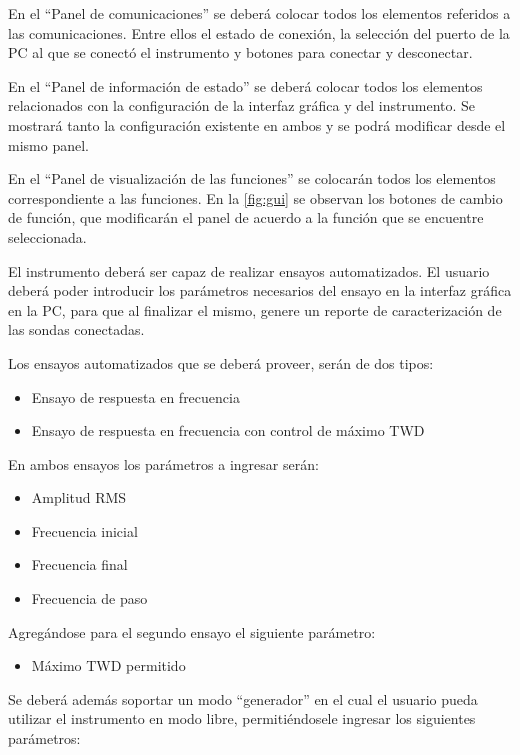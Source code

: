\documentclass[titlepage, 12pt]{article}
\begin{document}
  En el ``Panel de comunicaciones'' se deberá colocar todos los elementos referidos a las comunicaciones. Entre ellos el estado de conexión, la selección del puerto de la PC al que se conectó el instrumento y botones para conectar y desconectar.

  En el ``Panel de información de estado'' se deberá colocar todos los elementos relacionados con la configuración de la interfaz gráfica y del instrumento. Se mostrará tanto la configuración existente en ambos y se podrá modificar desde el mismo panel.

  En el ``Panel de visualización de las funciones'' se colocarán todos los elementos correspondiente a las funciones. En la \autoref{fig:gui} se observan los botones de cambio de función, que modificarán el panel de acuerdo a la función que se encuentre seleccionada.

  El instrumento deberá ser capaz de realizar ensayos automatizados. El usuario deberá poder introducir los parámetros necesarios del ensayo en la interfaz gráfica en la PC, para que al finalizar el mismo, genere un reporte de caracterización de las sondas conectadas.

  Los ensayos automatizados que se deberá proveer, serán de dos tipos:

    \begin{itemize}
      \item Ensayo de respuesta en frecuencia
      \item Ensayo de respuesta en frecuencia con control de máximo TWD
    \end{itemize}

  En ambos ensayos los parámetros a ingresar serán:

    \begin{itemize}
      \item Amplitud RMS
      \item Frecuencia inicial
      \item Frecuencia final
      \item Frecuencia de paso
    \end{itemize}

  Agregándose para el segundo ensayo el siguiente parámetro:

    \begin{itemize}
      \item Máximo TWD permitido
    \end{itemize}

  Se deberá además soportar un modo ``generador'' en el cual el usuario pueda utilizar el instrumento en modo libre, permitiéndosele ingresar los siguientes parámetros:
\end{document}
